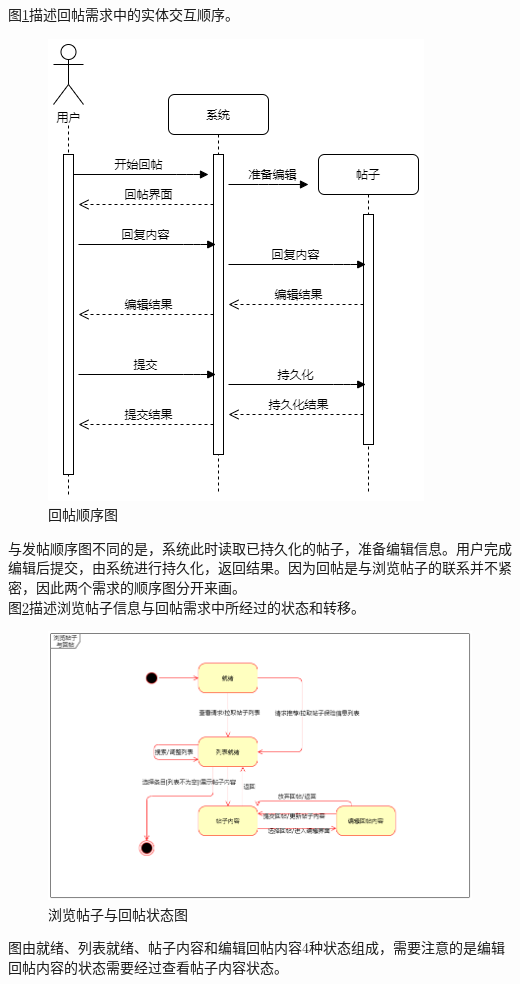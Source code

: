 \documentclass[a4paper]{ctexart}
\begin{document}
图\ref{fig:回帖顺序图}描述回帖需求中的实体交互顺序。
\begin{figure}[H]
\centering
\includegraphics[scale=0.5]{image/2_8顺序图.png}
\caption{回帖顺序图}
\label{fig:回帖顺序图}
\end{figure}
与发帖顺序图不同的是，系统此时读取已持久化的帖子，准备编辑信息。用户完成编辑后提交，由系统进行持久化，返回结果。因为回帖是与浏览帖子的联系并不紧密，因此两个需求的顺序图分开来画。\\

图\ref{fig:浏览帖子与回帖状态图}描述浏览帖子信息与回帖需求中所经过的状态和转移。
\begin{figure}[H]
\centering
\includegraphics[scale=0.5]{image/2_9状态图.png}
\caption{浏览帖子与回帖状态图}
\label{fig:浏览帖子与回帖状态图}
\end{figure}
图由就绪、列表就绪、帖子内容和编辑回帖内容4种状态组成，需要注意的是编辑回帖内容的状态需要经过查看帖子内容状态。
\end{document}
